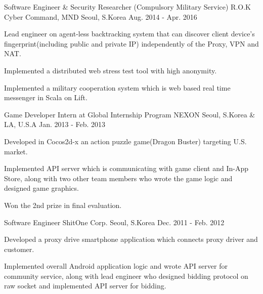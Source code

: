 \begin{cventries}
  \cventry
  {Software Engineer \& Security Researcher (Compulsory Military Service)} %
  {R.O.K Cyber Command, MND} %
  {Seoul, S.Korea} %
  {Aug. 2014 - Apr. 2016} %
  {
    \begin{cvitems} %
    \item {Lead engineer on agent-less backtracking system that can discover client device's
      fingerprint(including public and private IP) independently of the Proxy, VPN and NAT.}
    \item {Implemented a distributed web stress test tool with high anonymity.}
    \item {Implemented a military cooperation system which is web based real time messenger in Scala on Lift.}
    \end{cvitems}
  }

  \cventry
  {Game Developer Intern at Global Internship Program} %
  {NEXON} %
  {Seoul, S.Korea \& LA, U.S.A} %
  {Jan. 2013 - Feb. 2013} %
  {
    \begin{cvitems} %
    \item {Developed in Cocos2d-x an action puzzle game(Dragon Buster) targeting U.S. market.}
    \item {Implemented API server which is communicating with game client and In-App Store, along with two
      other team members who wrote the game logic and designed game graphics.}
    \item {Won the 2nd prize in final evaluation.}
    \end{cvitems}
  }

  \cventry
  {Software Engineer} %
  {ShitOne Corp.} %
  {Seoul, S.Korea} %
  {Dec. 2011 - Feb. 2012} %
  {
    \begin{cvitems} %
    \item {Developed a proxy drive smartphone application which connects proxy driver and customer.}
    \item {Implemented overall Android application logic and wrote API server for community service, along
      with lead engineer who designed bidding protocol on raw socket and implemented API server for bidding.}
    \end{cvitems}
  }


\end{cventries}
